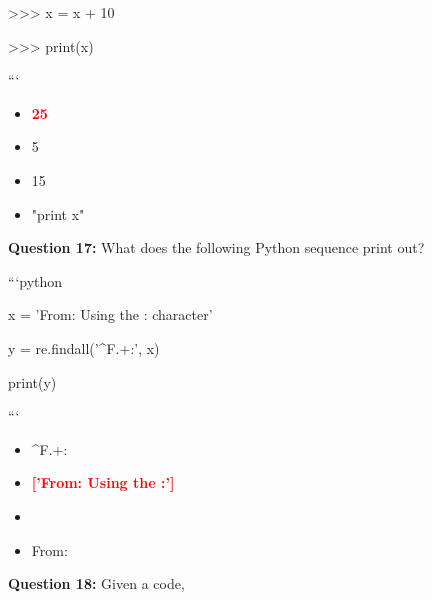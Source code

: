 \documentclass[12pt,a4paper]{article}
\begin{document}
\newline
>>> x = x + 10\newline

\newline
>>> print(x)\newline

\newline
```

\begin{itemize}
    \item[\textbf{A.}] \textcolor{red}{\textbf{25}}
    \item[\textbf{B.}] 5
    \item[\textbf{C.}] 15
    \item[\textbf{D.}] "print x"
\end{itemize}

\vspace{0.5cm}

\textbf{Question 17:} What does the following Python sequence print out?\newline

\newline
\newline

\newline
```python\newline

\newline
x = 'From: Using the : character'\newline

\newline
y = re.findall('^F.+:', x)\newline

\newline
print(y)\newline

\newline
```

\begin{itemize}
    \item[\textbf{A.}] ^F.+:
    \item[\textbf{B.}] \textcolor{red}{\textbf{['From: Using the :']}}
    \item[\textbf{C.}] ['From:']
    \item[\textbf{D.}] From:
\end{itemize}

\vspace{0.5cm}

\textbf{Question 18:} Given a code,\newline
\end{document}
